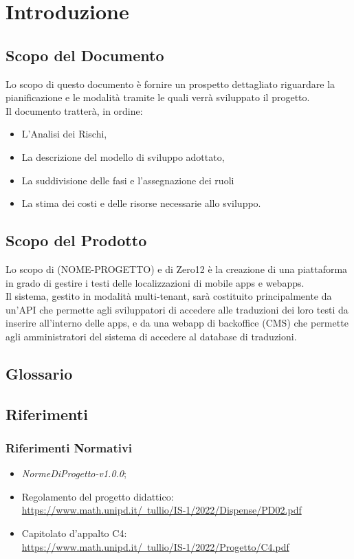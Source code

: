 \section{Introduzione}
\subsection{Scopo del Documento}
Lo scopo di questo documento è fornire un prospetto dettagliato riguardare la pianificazione e le modalità tramite le quali verrà sviluppato il progetto.\\
Il documento tratterà, in ordine:
\begin{itemize}
    \item L'Analisi dei Rischi,
    \item La descrizione del modello di sviluppo adottato,
    \item La suddivisione delle fasi e l'assegnazione dei ruoli
    \item La stima dei costi e delle risorse necessarie allo sviluppo.
\end{itemize}

\subsection{Scopo del Prodotto}
Lo scopo di (NOME-PROGETTO) e di Zero12 è la creazione di una piattaforma in grado di gestire i testi delle localizzazioni di mobile apps e webapps. \\
Il sistema, gestito in modalità multi-tenant, sarà costituito principalmente da un'API\glo{} che permette agli sviluppatori di accedere alle traduzioni dei loro 
testi da inserire all'interno delle apps, e da una webapp di backoffice (CMS) che permette agli amministratori del sistema di accedere al database di traduzioni.

\subsection{Glossario}
\gloDesc

\subsection{Riferimenti}
\subsubsection{Riferimenti Normativi} %
\begin{itemize}
    \item \emph{NormeDiProgetto-v1.0.0};
    \item Regolamento del progetto didattico: \\ \href{https://www.math.unipd.it/~tullio/IS-1/2022/Dispense/PD02.pdf}{\color{blue}https://www.math.unipd.it/~tullio/IS-1/2022/Dispense/PD02.pdf}
    \item Capitolato d'appalto C4: \\ \href{https://www.math.unipd.it/~tullio/IS-1/2022/Progetto/C4.pdf}{\color{blue}https://www.math.unipd.it/~tullio/IS-1/2022/Progetto/C4.pdf}
\end{itemize}

